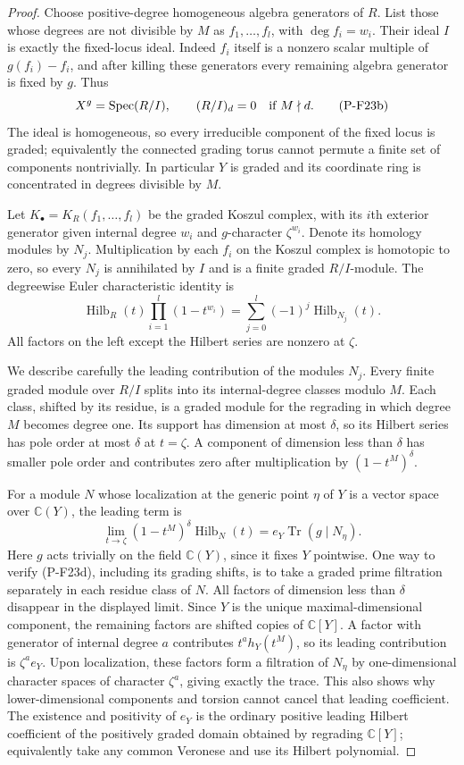 \documentclass[11pt,a4paper]{article}
\begin{document}
\begin{proof}
Choose positive-degree homogeneous algebra generators of $R$.
List those whose degrees are not divisible by $M$ as
$f_1,\ldots,f_l$, with $\deg f_i=w_i$. Their ideal $I$
is exactly the fixed-locus ideal. Indeed $f_i$ itself is a
nonzero scalar multiple of $g(f_i)-f_i$, and after killing
these generators every remaining algebra generator is fixed
by $g$. Thus
\[
 X^g=\operatorname{Spec}(R/I),
 \qquad (R/I)_d=0\quad\hbox{if }M\nmid d.
 \tag{P-F23b}
\]
The ideal is homogeneous, so every irreducible component of
the fixed locus is graded; equivalently the connected grading
torus cannot permute a finite set of components nontrivially.
In particular $Y$ is graded and its coordinate ring is
concentrated in degrees divisible by $M$.

Let $K_\bullet=K_R(f_1,\ldots,f_l)$ be the graded Koszul
complex, with its $i$th exterior generator given internal degree
$w_i$ and $g$-character $\zeta^{w_i}$. Denote its homology
modules by $N_j$. Multiplication by each $f_i$ on the Koszul
complex is homotopic to zero, so every $N_j$ is annihilated
by $I$ and is a finite graded $R/I$-module. The degreewise
Euler characteristic identity is
\[
 \operatorname{Hilb}_R(t)\prod_{i=1}^l(1-t^{w_i})
       =\sum_{j=0}^l(-1)^j\operatorname{Hilb}_{N_j}(t).
 \tag{P-F23c}
\]
All factors on the left except the Hilbert series are nonzero
at $\zeta$.

We describe carefully the leading contribution of the modules
$N_j$. Every finite graded module over $R/I$ splits into its
internal-degree classes modulo $M$. Each class, shifted by
its residue, is a graded module for the regrading in which
degree $M$ becomes degree one. Its support has dimension at
most $\delta$, so its Hilbert series has pole order at most
$\delta$ at $t=\zeta$. A component of dimension less than
$\delta$ has smaller pole order and contributes zero after
multiplication by $(1-t^M)^\delta$.

For a module $N$ whose localization at the generic point
$\eta$ of $Y$ is a vector space over $\mathbb C(Y)$, the
leading term is
\[
 \lim_{t\to\zeta}(1-t^M)^\delta\operatorname{Hilb}_N(t)
       = e_Y\operatorname{Tr}(g\mid N_\eta).
 \tag{P-F23d}
\]
Here $g$ acts trivially on the field $\mathbb C(Y)$, since it
fixes $Y$ pointwise. One way to verify (P-F23d), including its
grading shifts, is to take a graded prime filtration separately
in each residue class of $N$. All factors of dimension less
than $\delta$ disappear in the displayed limit. Since $Y$ is
the unique maximal-dimensional component, the remaining factors
are shifted copies of $\mathbb C[Y]$. A factor with generator
of internal degree $a$ contributes
$t^a h_Y(t^M)$, so its leading contribution is
$\zeta^a e_Y$. Upon localization, these factors form a
filtration of $N_\eta$ by one-dimensional character spaces of
character $\zeta^a$, giving exactly the trace. This also shows
why lower-dimensional components and torsion cannot cancel
that leading coefficient. The existence and positivity of
$e_Y$ is the ordinary positive leading Hilbert coefficient
of the positively graded domain obtained by regrading
$\mathbb C[Y]$; equivalently take any common Veronese and
use its Hilbert polynomial.


\end{proof}
\end{document}
